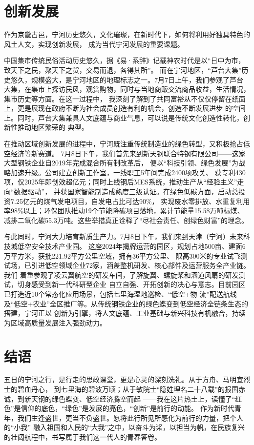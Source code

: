 \documentclass[11pt,a4paper]{ctexart}
\begin{document}
\section{创新发展}

作为京畿古邑，宁河历史悠久，文化璀璨，在新时代下，如何将利用好独具特色的风土人文，实现创新发展，
成为当代宁河发展的重要课题。

中国集市传统民俗活动历史悠久，据《易·系辞》记载神农时代是以“日中为市，致天下之民，聚天下之货，交易而退，各得其所”。
而在宁河地区，“芦台大集”历史悠久，规模盛大，是宁河地区的地理标志之一。7月7日上午，我们参观了芦台
大集，在集市上探访民风，观赏购物，同时与当地商贩交流商品收益，生活情况，集市历史等方面。在这一过程中，
我深刻了解到了共同富裕从不仅仅停留在纸面上，更是展现在政府不断为社会成员创造有利的机会，创造不断发展进步
的空间上。同时，芦台大集兼具人文底蕴与商业气息，可以说是传统文化创造性转化，创新性推动地区繁荣的
典型。

在推动区域创新发展的进程中，宁河既注重传统制造业的绿色转型，又积极抢占低空经济等新赛道。
7月8日下午，我们首先来到新天钢联合特钢有限公司——这家大型钢铁企业自2019年完成混合所有制改革后，
便以“科技引领、绿色发展”为战略加速升级。公司建立创新工作室，一线职工5年间完成2400项攻关、
获专利430项，仅2025年即创效超亿元；同时上线钢后MES系统，推动生产从“经验主义”走向“数据驱动”，
并获国家智能制造成熟度三级认证。在绿色低碳方面，启动总投资7.25亿元的煤气发电项目，自发电占比可达90\%，
实现废水零排放、水重复利用率98\%以上；环保团队推动19个节能降碳项目落地，累计节能量15.58万吨标煤、
减排二氧化碳55.3万吨。这些举措真正诠释了“尽社会责任、创绿色财富”的理念。

与此同时，宁河大力培育新质生产力。7月8日下午，我们来到天津（宁河）未来科技城低空安全技术产业园。
这座2024年揭牌运营的园区，规划占地500亩、建面6万平方米，获批221.92平方公里空域，拥有36平方公里、
限高300米的专业试飞测试场，已引进低空领域企业72家，涵盖整机研发、核心部件及运营服务全产业链。我们
着重参观了凌云翼航空的研发车间，了解旋翼、螺旋桨和涵道风扇的研发测试，切身感受到新一代科研型企业
自立自强、开拓创新的决心与意志。目前园区已打造近10个常态化应用场景，包括七里海湿地巡检、“低空+物
流”配送航线及“低空+农业”全区推广等。从传统钢铁企业的绿色蝶变到低空经济全链条生态的搭建，宁河正以
创新为引擎，将人文底蕴、工业基础与新兴科技有机融合，持续为区域高质量发展注入强劲动力。


\section{结语}

五日的宁河之行，是行走的思政课堂，更是心灵的深刻洗礼。从于方舟、马明宜烈士的碧血丹心，
到七里海的碧波万顷；从于敏院士“隐姓埋名二十八载”的报国赤诚，到新天钢的绿色蝶变、低空经济腾空而起
——我在这片热土上，读懂了“红色”是信仰的底色，“绿色”是发展的亮色，“创新”是前行的动能。
作为新时代青年，我们生逢盛世，更当不负盛世。愿将此行所见所感化为前行的力量，把个人的“小我”
融入祖国和人民的“大我”之中，以奋斗为桨，以担当为帆，在民族复兴的壮阔航程中，书写属于我们这一代人的青春答卷。
\end{document}
